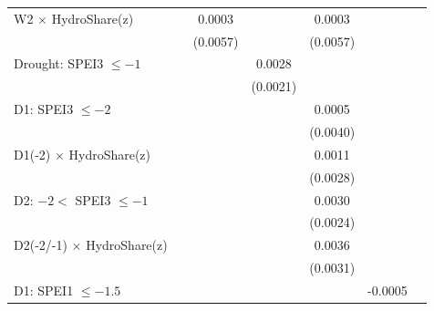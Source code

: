 {\begin{tabular}{l*{6}{c}}
\addlinespace
W2 $\times$ HydroShare(z)&                     &      0.0003         &                     &      0.0003         &                     &                     \\
                    &                     &    (0.0057)         &                     &    (0.0057)         &                     &                     \\
\addlinespace
Drought: SPEI3 $\leq -1$&                     &                     &      0.0028         &                     &                     &                     \\
                    &                     &                     &    (0.0021)         &                     &                     &                     \\
\addlinespace
D1: SPEI3 $\leq -2$ &                     &                     &                     &      0.0005         &                     &                     \\
                    &                     &                     &                     &    (0.0040)         &                     &                     \\
\addlinespace
D1(-2) $\times$ HydroShare(z)&                     &                     &                     &      0.0011         &                     &                     \\
                    &                     &                     &                     &    (0.0028)         &                     &                     \\
\addlinespace
D2: $-2 <$ SPEI3 $\leq -1$&                     &                     &                     &      0.0030         &                     &                     \\
                    &                     &                     &                     &    (0.0024)         &                     &                     \\
\addlinespace
D2(-2/-1) $\times$ HydroShare(z)&                     &                     &                     &      0.0036         &                     &                     \\
                    &                     &                     &                     &    (0.0031)         &                     &                     \\
\addlinespace
D1: SPEI1 $\leq -1.5$&                     &                     &                     &                     &     -0.0005         &                     \\

\end{tabular}}
